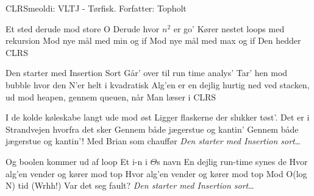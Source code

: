 \begin{sang}{CLRS}{meoldi: VLTJ - Tørfisk. Forfatter: Topholt}
    \begin{vers}
    Et sted derude mod store O
    Derude hvor $n^2$ er go'
    Kører nestet loops med rekursion
    Mod nye mål med min og if
    Mod nye mål med max og if
    Den hedder CLRS
    \end{vers}
    
    \begin{omkvaed}
    Den starter med Insertion Sort
    Går' over til run time analys' 
    Tar' hen mod bubble hvor den N'er helt i kvadratisk
    Alg'en er en dejlig hurtig ned ved stacken, ud mod heapen, gennem queuen, når
    Man læser i CLRS
    \end{omkvaed}
    
    \begin{vers}
    I de kolde køleskabe langt ude mod øst
    Ligger flaskerne der slukker tøst'.
    Det er i Strandvejen hvorfra det sker
    Gennem både jægerstue og kantin'
    Gennem både jægerstue og kantin'!
    Med Brian som chauffør
    \emph{Den starter med Insertion sort}\ldots
    \end{vers}
    
    \begin{vers}
    Og boolen kommer ud af loop
    Et i-n i $\Theta$s navn
    En dejlig run-time synes de
    Hvor alg'en vender og kører mod top
    Hvor alg'en vender og kører mod top
    Mod O(log N) tid (Wrhh!)
    Var det seg fault?
    \emph{Den starter med Insertion sort}\ldots
    \end{vers}
    
    \end{sang}